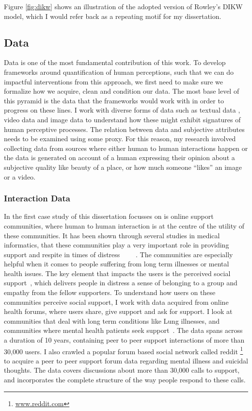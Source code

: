 Figure \ref{fig:dikw} shows an illustration of the adopted version of Rowley's DIKW model, which I would refer back as a repeating motif for my dissertation.

\subsection{Data}
Data is one of the most fundamental contribution of this work. To develop frameworks around quantification of human perceptions, such that we can do impactful interventions from this approach, we first need to make sure we formalize how we acquire, clean and condition our data. The most base level of this pyramid is the data that the frameworks would work with in order to progress on these lines. I work with diverse forms of data such as textual data , video data and image data to understand how these might exhibit signatures of human perceptive processes. The relation between data and subjective attributes needs to be examined using some proxy. For this reason, my research involved collecting data from sources where either human to human interactions happen or the data is generated on account of a human expressing their opinion about a subjective quality like beauty of a place, or how much someone ``likes'' an image or a video.

\subsubsection{Interaction Data}
In the first case study of this dissertation focusses on is online support communities, where human to human interaction is at the centre of the utility of these communities. It has been shown through several studies in medical informatics, that these communities play a very important role in providing support and respite in times of distress~\cite{allen2016long}~\cite{mo2012developing,pendry2015individual} ~\cite{bartlett2011investigation,izuka2017stroke}~\cite{hobbs2016online}. The communities are especially helpful when it comes to people suffering from long term illnesses or mental health issues.
The key element that impacts the users is the perceived social support~\cite{nambisan2011information}, which delivers people in distress a sense of belonging to a group and empathy from the fellow supporters. 
To understand how users on these communities perceive social support, I work with data acquired from online health forums, where users share, give support and ask for support. I look at communities that deal with long term conditions like Lung illnesses, and communities where mental health patients seek support~\cite{joglekar2018online}. The data spans across a duration of 10 years, containing peer to peer support interactions of more than 30,000 users. I also crawled a popular forum based social network called reddit \footnote{\url{www.reddit.com}} to acquire a peer to peer support forum data regarding mental illness and suicidal thoughts. The data covers discussions about more than 30,000 calls to support, and incorporates the complete structure of the way people respond to these calls. 

